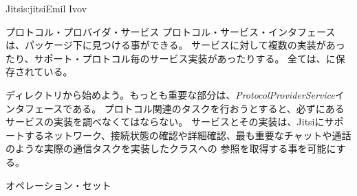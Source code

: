 \begin{aosachapter}{Jitsi}{s:jitsi}{Emil Ivov}
\begin{aosasect1}{プロトコル・プロバイダ・サービス}
プロトコル・サービス・インタフェースは、パッケージ下に見つける事ができる。
サービスに対して複数の実装があったり、サポート・プロトコル毎のサービス実装があったりする。
全ては、に保存されている。

ディレクトリから始めよう。もっとも重要な部分は、\emph{ProtocolProviderService}インタフェースである。
プロトコル関連のタスクを行おうとすると、必ずにあるサービスの実装を調べなくてはならない。
サービスとその実装は、Jitsiにサポートするネットワーク、接続状態の確認や詳細確認、最も重要なチャットや通話のような実際の通信タスクを実装したクラスへの
参照を取得する事を可能にする。

\begin{aosasect2}{オペレーション・セット}


\end{aosasect2}
\end{aosasect1}
\end{aosachapter}
